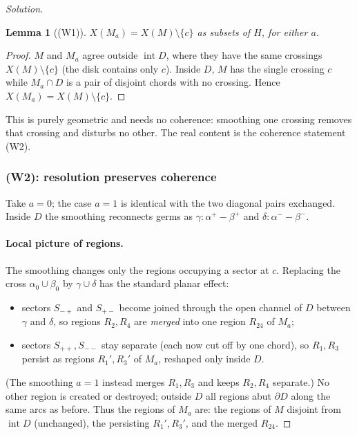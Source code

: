 \documentclass{amsart}
\newtheorem{lemma}{Lemma}
\theoremstyle{definition}
\newcommand{\bdy}{\partial}
\begin{document}
\begin{proof}[Solution]
\begin{lemma}[(W1)]\label{lem:W1}
$X(M_a)=X(M)\setminus\{c\}$ as subsets of $H$, for either $a$.
\end{lemma}

\begin{proof}
$M$ and $M_a$ agree outside $\operatorname{int}D$, where they have the same crossings
$X(M)\setminus\{c\}$ (the disk contains only $c$). Inside $D$, $M$ has the single crossing $c$
while $M_a\cap D$ is a pair of disjoint chords with no crossing. Hence
$X(M_a)=X(M)\setminus\{c\}$.
\end{proof}

This is purely geometric and needs no coherence: smoothing one crossing removes that crossing
and disturbs no other. The real content is the coherence statement (W2).

\subsubsection{(W2): resolution preserves coherence}\label{ssec:W2}

Take $a=0$; the case $a=1$ is identical with the two diagonal pairs exchanged. Inside $D$ the
smoothing reconnects germs as $\gamma\colon\alpha^+\!-\!\beta^+$ and
$\delta\colon\alpha^-\!-\!\beta^-$.

\paragraph{Local picture of regions.}
The smoothing changes only the regions occupying a sector at $c$. Replacing the cross
$\alpha_0\cup\beta_0$ by $\gamma\cup\delta$ has the standard planar effect:
\begin{itemize}
\item sectors $S_{-+}$ and $S_{+-}$ become joined through the open channel of $D$ between
$\gamma$ and $\delta$, so regions $R_2,R_4$ are \emph{merged} into one region $R_{24}$ of $M_a$;
\item sectors $S_{++},S_{--}$ stay separate (each now cut off by one chord), so $R_1,R_3$
persist as regions $R_1',R_3'$ of $M_a$, reshaped only inside $D$.
\end{itemize}
(The smoothing $a=1$ instead merges $R_1,R_3$ and keeps $R_2,R_4$ separate.) No other region is
created or destroyed; outside $D$ all regions abut $\bdy D$ along the same arcs as before. Thus
the regions of $M_a$ are: the regions of $M$ disjoint from $\operatorname{int}D$ (unchanged),
the persisting $R_1',R_3'$, and the merged $R_{24}$.


\end{proof}
\end{document}
